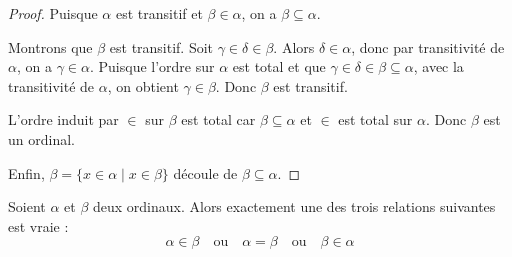 \begin{proof}
	Puisque $\alpha$ est transitif et $\beta \in \alpha$, on a $\beta \subseteq \alpha$.

	Montrons que $\beta$ est transitif. Soit $\gamma \in \delta \in \beta$. Alors $\delta \in \alpha$, donc par transitivité de $\alpha$, on a $\gamma \in \alpha$. Puisque l'ordre sur $\alpha$ est total et que $\gamma \in \delta \in \beta \subseteq \alpha$, avec la transitivité de $\alpha$, on obtient $\gamma \in \beta$. Donc $\beta$ est transitif.

	L'ordre induit par $\in$ sur $\beta$ est total car $\beta \subseteq \alpha$ et $\in$ est total sur $\alpha$. Donc $\beta$ est un ordinal.

	Enfin, $\beta = \{x \in \alpha \mid x \in \beta\}$ découle de $\beta \subseteq \alpha$.
\end{proof}

\begin{theoreme}\label{thm:comparaison_ordinaux}
	Soient $\alpha$ et $\beta$ deux ordinaux. Alors exactement une des trois relations suivantes est vraie :
	$$\alpha \in \beta \quad \text{ou} \quad \alpha = \beta \quad \text{ou} \quad \beta \in \alpha$$
\end{theoreme}

